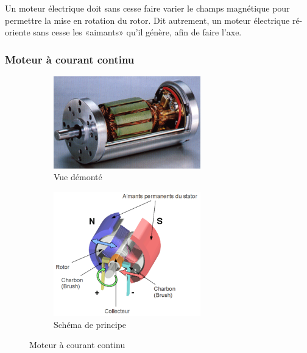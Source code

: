 \documentclass[10pt,fleqn]{article} %
\begin{document}
\begin{obj}
  Un moteur électrique doit sans cesse faire varier le champs magnétique pour permettre la mise en rotation du rotor. Dit autrement, un moteur électrique ré-oriente sans cesse les «aimants» qu'il génère, afin de faire l'axe.
\end{obj}

\subsubsection{Moteur à courant continu}
\begin{figure}[h]
  \centering
  \begin{subfigure}{0.5\textwidth}
    \centering
    \includegraphics[width=0.7\textwidth]{images/moteur_continu}
    \caption{Vue démonté}
  \end{subfigure}\hfill
  \begin{subfigure}{.5\textwidth}
    \centering
    \includegraphics[width=0.7\textwidth]{images/moteur_continu_explose}
    \caption{Schéma de principe}
  \end{subfigure}
  \caption{Moteur à courant continu}
  \label{fig:induction}
\end{figure}
\end{document}
